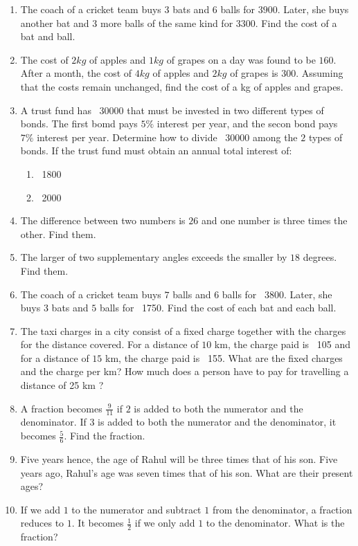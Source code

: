 \begin{enumerate}[label=\thesubsection.\arabic*, ref=\thesubsection.\theenumi]
\item The coach of a cricket team buys $3$ bats and $6$ balls for  \rupee $ 3900$.  Later,  she buys another bat and $3$ more balls of the same kind for  \rupee $ 3300$.  Find the cost of a bat and ball. 
\item The cost of $2kg$ of apples and $1kg$ of grapes on a day was found to be  \rupee $ 160$.  After a month,  the cost of $4kg$ of apples and $2kg$ of grapes is  \rupee $ 300$.  Assuming that the costs remain unchanged,  find the cost of a kg of apples and grapes.  
\item A trust fund has \rupee~30000 that must be invested in two different types of bonds.  The first bomd pays $5\%$  interest per year,  and the secon bond pays $7\%$ interest per year.   Determine how to divide \rupee~30000 among the $2$ types of bonds.  If the trust fund must obtain an annual total interest of:
\begin{enumerate}
\item \rupee~1800
\item \rupee~2000
\end{enumerate}
    \item The difference between two numbers is $26$ and one number is three times the other.  Find them. 
    \item The larger of two supplementary angles exceeds the smaller by $18$ degrees.  Find them. 
    \item The coach of a cricket team buys $7$ balls and $6$ balls for \rupee~3800.  Later,  she buys $3$ bats and $5$ balls for \rupee~1750.  Find the cost of each bat and each ball. 
    \item The taxi charges in a city consist of a fixed charge together with the charges for the distance covered.  For a distance of $10$ km,  the charge paid is \rupee~105 and for a distance of $15$ km,  the charge paid is \rupee~155.  What are the fixed charges and the charge per km? How much does a person have to pay for travelling a distance of 25 km ? 
    \item A fraction becomes $\frac{9}{11}$ if $2$ is added to both the numerator and the denominator.  If $3$ is added to both the numerator and the denominator,  it becomes $\frac{5}{6}$.  Find the fraction. 
    \item Five years hence,  the age of Rahul will be three times that of his son.  Five years ago,  Rahul's age was seven times that of his son.  What are their present ages?
\item If we add $1$ to the numerator and subtract $1$ from the denominator,  a fraction reduces to $1$.  It becomes $\frac{1}{2}$ if we only add $1$ to the denominator.  What is the fraction?

\end{enumerate}
